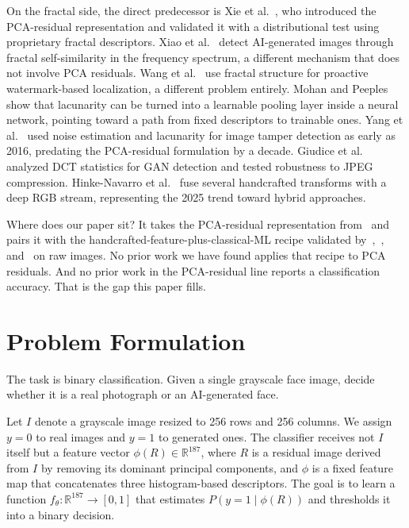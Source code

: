 \documentclass[runningheads]{llncs}
\begin{document}
On the fractal side, the direct predecessor is Xie et al.~\cite{xie2026}, who introduced the PCA-residual representation and validated it with a distributional test using proprietary fractal descriptors. Xiao et al.~\cite{xiao2025} detect AI-generated images through fractal self-similarity in the frequency spectrum, a different mechanism that does not involve PCA residuals. Wang et al.~\cite{wang2025} use fractal structure for proactive watermark-based localization, a different problem entirely. Mohan and Peeples~\cite{mohan2024} show that lacunarity can be turned into a learnable pooling layer inside a neural network, pointing toward a path from fixed descriptors to trainable ones. Yang et al.~\cite{yang2016} used noise estimation and lacunarity for image tamper detection as early as 2016, predating the PCA-residual formulation by a decade. Giudice et al.~\cite{giudice2021} analyzed DCT statistics for GAN detection and tested robustness to JPEG compression. Hinke-Navarro et al.~\cite{hinke2025} fuse several handcrafted transforms with a deep RGB stream, representing the 2025 trend toward hybrid approaches.

Where does our paper sit? It takes the PCA-residual representation from~\cite{xie2026} and pairs it with the handcrafted-feature-plus-classical-ML recipe validated by~\cite{yasir2025},~\cite{nirob2026}, and~\cite{chaudhari2026} on raw images. No prior work we have found applies that recipe to PCA residuals. And no prior work in the PCA-residual line reports a classification accuracy. That is the gap this paper fills.


\section{Problem Formulation}

The task is binary classification. Given a single grayscale face image, decide whether it is a real photograph or an AI-generated face.

Let $I$ denote a grayscale image resized to 256 rows and 256 columns. We assign $y = 0$ to real images and $y = 1$ to generated ones. The classifier receives not $I$ itself but a feature vector $\phi(R) \in \mathbb{R}^{187}$, where $R$ is a residual image derived from $I$ by removing its dominant principal components, and $\phi$ is a fixed feature map that concatenates three histogram-based descriptors. The goal is to learn a function $f_\theta : \mathbb{R}^{187} \to [0,1]$ that estimates $P(y=1 \mid \phi(R))$ and thresholds it into a binary decision.
\end{document}
